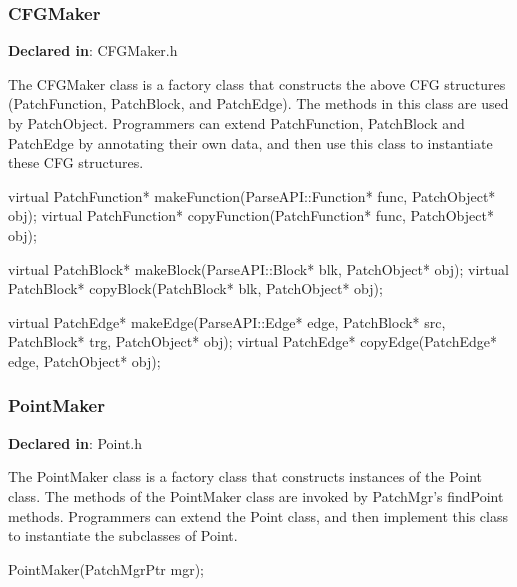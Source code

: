 
\subsubsection{CFGMaker}
\label{sec-3.2.12}

\textbf{Declared in}: CFGMaker.h

The CFGMaker class is a factory class that constructs the above CFG structures
(PatchFunction, PatchBlock, and PatchEdge). The methods in this class are used
by PatchObject. Programmers can extend PatchFunction, PatchBlock and PatchEdge
by annotating their own data, and then use this class to instantiate these CFG
structures.


\begin{apient}
virtual PatchFunction* makeFunction(ParseAPI::Function* func, PatchObject* obj);
virtual PatchFunction* copyFunction(PatchFunction* func, PatchObject* obj);

virtual PatchBlock* makeBlock(ParseAPI::Block* blk, PatchObject* obj);
virtual PatchBlock* copyBlock(PatchBlock* blk, PatchObject* obj);

virtual PatchEdge* makeEdge(ParseAPI::Edge* edge, PatchBlock* src,
                            PatchBlock* trg, PatchObject* obj);
virtual PatchEdge* copyEdge(PatchEdge* edge, PatchObject* obj);
\end{apient}


\subsubsection{PointMaker}
\label{sec-3.2.13}

\textbf{Declared in}: Point.h

The PointMaker class is a factory class that constructs instances of the Point
class. The methods of the PointMaker class are invoked by PatchMgr's findPoint
methods. Programmers can extend the Point class, and then implement this class
to instantiate the subclasses of Point.


\begin{apient}
PointMaker(PatchMgrPtr mgr);
\end{apient}


